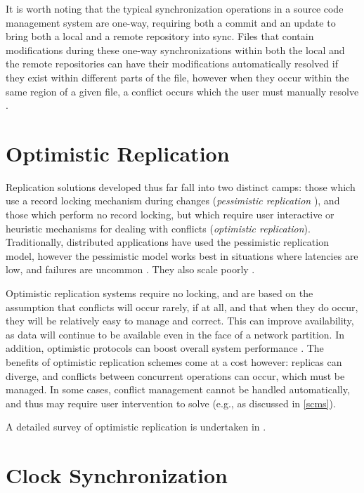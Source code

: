 It is worth noting that the typical synchronization operations in a source code management system are one-way, requiring both a commit and an update to bring both a local and a remote repository into sync.  Files that contain modifications during these one-way synchronizations within both the local and the remote repositories can have their modifications automatically resolved if they exist within different parts of the file, however when they occur within the same region of a given file, a conflict occurs which the user must manually resolve \cite{wiki:CVS, RefWorks:8}.

\section{Optimistic Replication}

Replication solutions developed thus far fall into two distinct camps:  those which use a record locking mechanism during changes (\emph{pessimistic replication} \cite{RefWorks:6}), and those which perform no record locking, but which require user interactive or heuristic mechanisms for dealing with conflicts (\emph{optimistic replication}).  Traditionally, distributed applications have used the pessimistic replication model, however the pessimistic model works best in situations where latencies are low, and failures are uncommon \cite{RefWorks:22}.  They also scale poorly \cite{1124156}.

Optimistic replication systems require no locking, and are based on the assumption that conflicts will occur rarely, if at all, and that when they do occur, they will be relatively easy to manage and correct.  This can improve availability, as data will continue to be available even in the face of a network partition.  In addition, optimistic protocols can boost overall system performance \cite{970581}. The benefits of optimistic replication schemes come at a cost however:  replicas can diverge, and conflicts between concurrent operations can occur, which must be managed.  In some cases, conflict management cannot be handled automatically, and thus may require user intervention to solve (e.g., as discussed in \ref{scms}).

A detailed survey of optimistic replication is undertaken in \cite{RefWorks:22}.

\section{Clock Synchronization}

